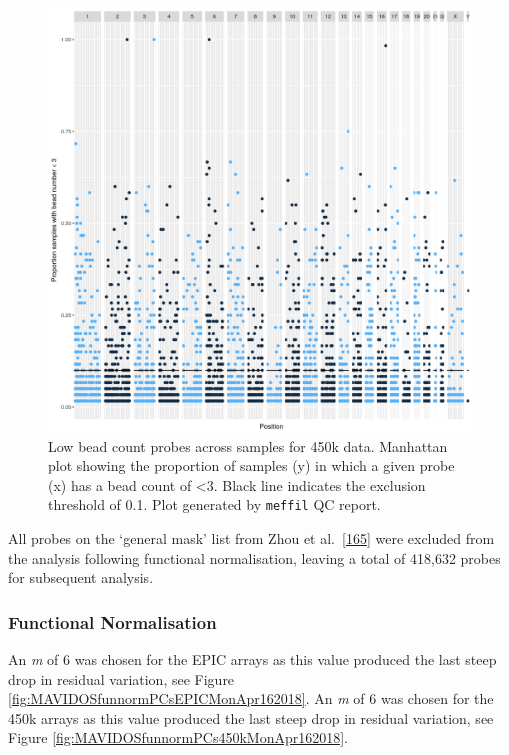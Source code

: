 \documentclass[
]{book}
\begin{document}
\begin{figure}

{\centering \includegraphics[width=0.8\linewidth]{figs/MAVIDOSqc450kbeadNumAcross} 

}

\caption{Low bead count probes across samples for 450k data. Manhattan plot showing the proportion of samples (y) in which a given probe (x) has a bead count of \textless3. Black line indicates the exclusion threshold of 0.1. Plot generated by \texttt{meffil} QC report.}\label{fig:MAVIDOSqc450kbeadNumAcross}
\end{figure}



All probes on the `general mask' list from Zhou et al.~{[}\protect\hyperlink{ref-Zhou2017}{165}{]} were excluded from the analysis following functional normalisation, leaving a total of 418,632 probes for subsequent analysis.

\hypertarget{functional-normalisation-1}{%
\subsubsection{Functional Normalisation}\label{functional-normalisation-1}}

An \emph{m} of 6 was chosen for the EPIC arrays as this value produced the last steep drop in residual variation, see Figure \ref{fig:MAVIDOSfunnormPCsEPICMonApr162018}.
An \emph{m} of 6 was chosen for the 450k arrays as this value produced the last steep drop in residual variation, see Figure \ref{fig:MAVIDOSfunnormPCs450kMonApr162018}.
\end{document}

